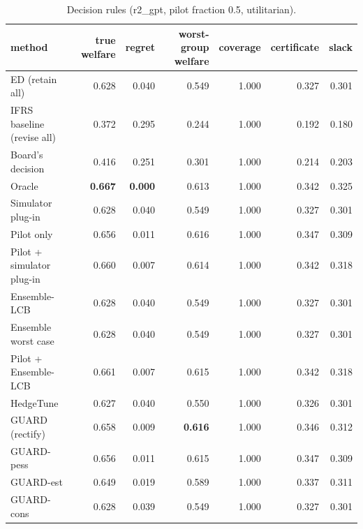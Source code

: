 \begin{table}[t]
\centering
\small
\begin{tabular}{lrrrrrr}
\toprule
method & true welfare & regret & worst-group welfare & coverage & certificate & slack \\
\midrule
ED (retain all) & 0.628 & 0.040 & 0.549 & 1.000 & 0.327 & 0.301 \\
IFRS baseline (revise all) & 0.372 & 0.295 & 0.244 & 1.000 & 0.192 & 0.180 \\
Board's decision & 0.416 & 0.251 & 0.301 & 1.000 & 0.214 & 0.203 \\
Oracle & \textbf{0.667} & \textbf{0.000} & 0.613 & 1.000 & 0.342 & 0.325 \\
Simulator plug-in & 0.628 & 0.040 & 0.549 & 1.000 & 0.327 & 0.301 \\
Pilot only & 0.656 & 0.011 & 0.616 & 1.000 & 0.347 & 0.309 \\
Pilot + simulator plug-in & 0.660 & 0.007 & 0.614 & 1.000 & 0.342 & 0.318 \\
Ensemble-LCB & 0.628 & 0.040 & 0.549 & 1.000 & 0.327 & 0.301 \\
Ensemble worst case & 0.628 & 0.040 & 0.549 & 1.000 & 0.327 & 0.301 \\
Pilot + Ensemble-LCB & 0.661 & 0.007 & 0.615 & 1.000 & 0.342 & 0.318 \\
HedgeTune & 0.627 & 0.040 & 0.550 & 1.000 & 0.326 & 0.301 \\
GUARD (rectify) & 0.658 & 0.009 & \textbf{0.616} & 1.000 & 0.346 & 0.312 \\
GUARD-pess & 0.656 & 0.011 & 0.615 & 1.000 & 0.347 & 0.309 \\
GUARD-est & 0.649 & 0.019 & 0.589 & 1.000 & 0.337 & 0.311 \\
GUARD-cons & 0.628 & 0.039 & 0.549 & 1.000 & 0.327 & 0.301 \\
\bottomrule
\end{tabular}
\caption{Decision rules (r2\_gpt, pilot fraction 0.5, utilitarian).}
\label{tab:methods-utilitarian}
\end{table}
